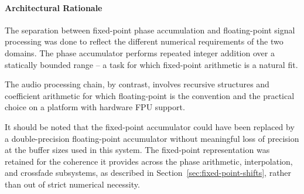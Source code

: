 \paragraph{Architectural Rationale}

The separation between fixed-point phase accumulation and floating-point signal processing was done to reflect the different numerical requirements of the two domains. 
The phase accumulator performs repeated integer addition over a statically bounded range -- a task for which fixed-point arithmetic is a natural fit. 

The audio processing chain, by contrast, involves recursive structures and coefficient arithmetic for which floating-point is the convention and the practical choice on a platform with hardware FPU support.

It should be noted that the fixed-point accumulator could have been replaced by a double-precision floating-point accumulator without meaningful loss of precision at the buffer sizes used in this system. 
The fixed-point representation was retained for the coherence it provides across the phase arithmetic, interpolation, and crossfade subsystems, as described in Section~\ref{sec:fixed-point-shifts}, rather than out of strict numerical necessity.